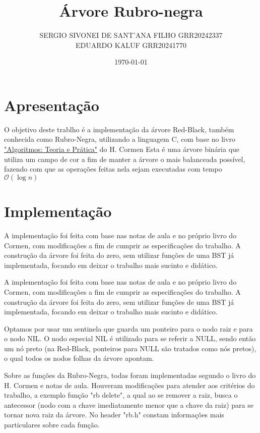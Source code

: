 \documentclass{article}
\title{Árvore Rubro-negra}
\author{SERGIO SIVONEI DE SANT'ANA FILHO GRR20242337\\EDUARDO KALUF GRR20241770}
\date{\today}
\begin{document}
    \maketitle
    
    \section{Apresentação}
    
    O objetivo deste trablho é a implementação da árvore Red-Black, também conhecida como Rubro-Negra, utilizando a linguagem C, com base no livro \href{https://computerscience360.wordpress.com/wp-content/uploads/2018/02/algoritmos-teoria-e-prc3a1tica-3ed-thomas-cormen.pdf}{"Algoritmos: Teoria e Prática"} do H. Cormen
    Esta é uma árvore binária que utiliza um campo de cor a fim de manter a árvore o mais balanceada possível, fazendo com que as operações feitas nela sejam executadas com tempo $\mathcal{O}(\log n)$

    \section{Implementação}

    A implementação foi feita com base nas notas de aula e no próprio livro do Cormen, com modificações a fim de cumprir as especificações do trabalho.
    A construção da árvore foi feita do zero, sem utilizar funções de uma BST já implementada, focando em deixar o trabalho mais sucinto e didático.

    A implementação foi feita com base nas notas de aula e no próprio livro do Cormen, com modificações a fim de cumprir as especificações do trabalho.
    A construção da árvore foi feita do zero, sem utilizar funções de uma BST já implementada, focando em deixar o trabalho mais sucinto e didático.

    Optamos por usar um sentinela que guarda um ponteiro para o nodo raiz e para o nodo NIL. O nodo especial NIL é utilizado para se referir a NULL, sendo então um nó preto (na Red-Black, ponteiros para NULL são tratados como nós pretos), o qual todos os nodos folhas da árvore apontam.

    Sobre as funções da Rubro-Negra, todas foram implementadas segundo o livro do H. Cormen e notas de aula. Houveram modificações para atender aos critérios do trabalho, a exemplo função "rb delete", a qual ao se remover a raiz, busca o antecessor (nodo com a chave imediatamente menor que a chave da raiz) para se tornar nova raiz da árvore. No header "rb.h" constam informações mais particulares sobre cada função.
\end{document}
